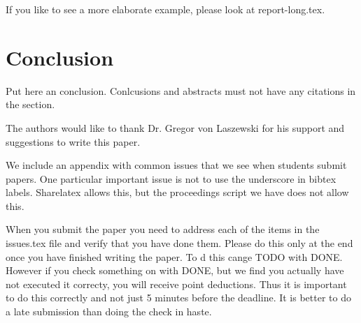 \documentclass[sigconf]{acmart}
\begin{document}
If you like to see a more elaborate example, please look at
report-long.tex. 

\section{Conclusion}

Put here an conclusion. Conlcusions and abstracts must not have any
citations in the section.


\begin{acks}

  The authors would like to thank Dr. Gregor von Laszewski for his
  support and suggestions to write this paper.

\end{acks}


 

\appendix

We include an appendix with common issues that we see when students
submit papers. One particular important issue is not to use the
underscore in bibtex labels. Sharelatex allows this, but the
proceedings script we have does not allow this.

When you submit the paper you need to address each of the items in the
issues.tex file and verify that you have done them. Please do this
only at the end once you have finished writing the paper. To d this
cange TODO with DONE. However if you check something on with DONE, but
we find you actually have not executed it correcty, you will receive
point deductions. Thus it is important to do this correctly and not
just 5 minutes before the deadline. It is better to do a late
submission than doing the check in haste. 


\end{document}
